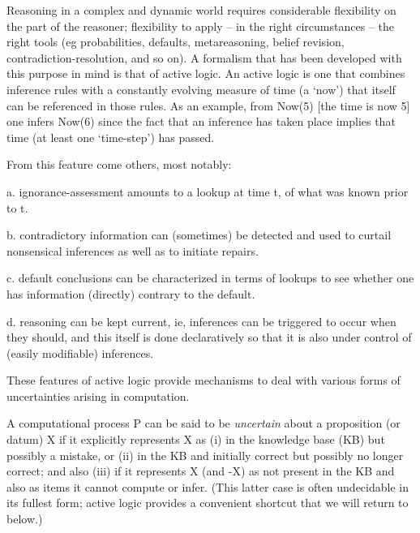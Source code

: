 
Reasoning in a complex and dynamic world requires considerable
flexibility on the part of the reasoner; flexibility to apply -- in
the right circumstances -- the right tools (eg probabilities,
defaults, metareasoning, belief revision, contradiction-resolution,
and so on).  A formalism that has been developed with this purpose in
mind is that of active logic.  An active logic is one that combines
inference rules with a constantly evolving measure of time (a `now')
that itself can be referenced in those rules. As an example, from
Now(5) [the time is now 5] one infers Now(6) since the fact that an
inference has taken place implies that time (at least one `time-step')
has passed.

From this feature come others, most notably:

a. ignorance-assessment amounts to a lookup at time t, of what was
    known prior to t.

b. contradictory information can (sometimes) be detected and used to
   curtail nonsensical inferences as well as to initiate repairs.

c. default conclusions can be characterized in terms of lookups to see
   whether one has information (directly) contrary to the default.

d. reasoning can be kept current, ie, inferences can be triggered to
   occur when they should, and this itself is done declaratively so
   that it is also under control of (easily modifiable) inferences.

These features of active logic provide mechanisms to deal with
various forms of uncertainties arising in computation. 

A computational process P can be said to be {\em uncertain} about a
proposition (or datum) X if it explicitly represents X as (i) in the
knowledge base (KB) but possibly a mistake, or (ii) in the KB and
initially correct but possibly no longer correct; and also (iii) if it
represents X (and -X) as not present in the KB and also as items it
cannot compute or infer.  (This latter case is often undecidable in its
fullest form; active logic provides a convenient shortcut that we will
return to below.)




